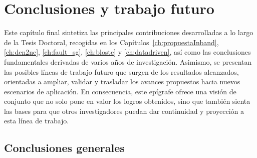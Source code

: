 \chapter{Conclusiones y trabajo futuro}
\label{ch:conclusiones}

Este capítulo final sintetiza las principales contribuciones desarrolladas a lo largo de la Tesis Doctoral, recogidas en los Capítulos~\ref{ch:propuestaInband}, \ref{ch:den2ne}, \ref{ch:fault_sg}, \ref{ch:bloste} y \ref{ch:datadriven}, así como las conclusiones fundamentales derivadas de varios años de investigación. Asimismo, se presentan las posibles líneas de trabajo futuro que surgen de los resultados alcanzados, orientadas a ampliar, validar y trasladar los avances propuestos hacia nuevos escenarios de aplicación. En consecuencia, este epígrafe ofrece una visión de conjunto que no solo pone en valor los logros obtenidos, sino que también sienta las bases para que otros investigadores puedan dar continuidad y proyección a esta línea de trabajo. 

\section{Conclusiones generales}

